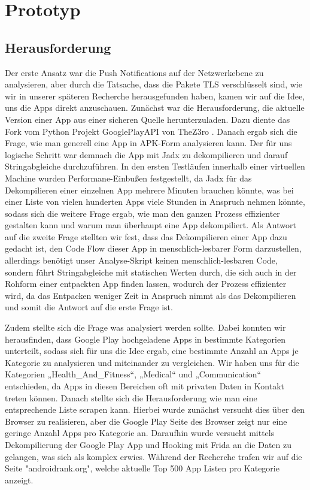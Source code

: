 \documentclass[sigconf]{acmart}
\begin{document}
\section{Prototyp}

\subsection{Herausforderung}
Der erste Ansatz war die Push Notifications auf der Netzwerkebene zu analysieren,
aber durch die Tatsache, dass die Pakete TLS verschlüsselt sind, wie wir in unserer späteren
Recherche herausgefunden haben, kamen wir auf die Idee, uns die Apps direkt anzuschauen. Zunächst
war die Herausforderung, die aktuelle Version einer App aus einer sicheren Quelle herunterzuladen.
Dazu diente das Fork vom Python Projekt GooglePlayAPI von TheZ3ro \cite{googleplayapi}.
Danach ergab sich die Frage, wie man generell eine App in APK-Form analysieren kann.
Der für uns logische Schritt war demnach die App mit Jadx \cite{jadx} zu dekompilieren und darauf Stringabgleiche
durchzuführen. In den ersten Testläufen innerhalb einer virtuellen Machine wurden Performane-Einbußen festgestellt,
da Jadx für das Dekompilieren einer einzelnen App mehrere Minuten brauchen könnte, was bei einer Liste von vielen hunderten
Apps viele Stunden in Anspruch nehmen könnte, sodass sich die weitere Frage ergab, wie man den ganzen Prozess effizienter gestalten kann
und warum man überhaupt eine App dekompiliert. Als Antwort auf die zweite Frage stellten wir fest, dass das Dekompilieren
einer App dazu gedacht ist, den Code Flow dieser App in menschlich-lesbarer Form darzustellen, allerdings 
benötigt unser Analyse-Skript keinen menschlich-lesbaren Code, sondern führt Stringabgleiche mit statischen Werten durch,
die sich auch in der Rohform einer entpackten App finden lassen, wodurch der Prozess effizienter wird, da das 
Entpacken weniger Zeit in Anspruch nimmt als das Dekompilieren und somit die Antwort auf die erste Frage ist.

Zudem stellte sich die Frage was analysiert werden sollte. Dabei konnten wir herausfinden,
dass Google Play hochgeladene Apps in bestimmte Kategorien unterteilt, sodass sich für uns die Idee ergab,
eine bestimmte Anzahl an Apps je Kategorie zu analysieren und miteinander zu vergleichen. Wir haben uns für die Kategorien
„Health\_And\_Fitness“, „Medical“ und „Communication“ entschieden, da Apps in diesen Bereichen oft mit privaten Daten 
in Kontakt treten können. Danach stellte sich die Herausforderung wie man eine entsprechende Liste scrapen kann.
Hierbei wurde zunächst versucht dies über den Browser zu realisieren, aber die Google Play Seite des Browser zeigt nur eine geringe Anzahl Apps
pro Kategorie an. Daraufhin wurde versucht mittels Dekompilierung der Google Play App und Hooking mit Frida \cite{frida}
an die Daten zu gelangen, was sich als komplex erwies. Während der Recherche trafen wir auf die Seite "androidrank.org", welche
aktuelle Top 500 App Listen pro Kategorie anzeigt.
\end{document}
